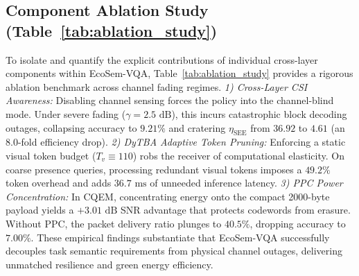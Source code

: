 \begin{table}[!t]
\centering
\caption{Component Ablation Analysis Across Channel Operating Regimes}
\label{tab:ablation_study}
\footnotesize
{}
\end{table}

\subsection{Component Ablation Study (Table~\ref{tab:ablation_study})}
To isolate and quantify the explicit contributions of individual cross-layer components within EcoSem-VQA, Table~\ref{tab:ablation_study} provides a rigorous ablation benchmark across channel fading regimes.
\textit{1) Cross-Layer CSI Awareness:} Disabling channel sensing forces the policy into the channel-blind mode. Under severe fading ($\gamma = 2.5\text{ dB}$), this incurs catastrophic block decoding outages, collapsing accuracy to $9.21\%$ and cratering $\eta_{\mathrm{SEE}}$ from $36.92$ to $4.61$ (an $8.0$-fold efficiency drop).
\textit{2) DyTBA Adaptive Token Pruning:} Enforcing a static visual token budget ($T_v \equiv 110$) robs the receiver of computational elasticity. On coarse presence queries, processing redundant visual tokens imposes a $49.2\%$ token overhead and adds $36.7\text{ ms}$ of unneeded inference latency.
\textit{3) PPC Power Concentration:} In CQEM, concentrating energy onto the compact 2000-byte payload yields a $+3.01\text{ dB}$ SNR advantage that protects codewords from erasure. Without PPC, the packet delivery ratio plunges to $40.5\%$, dropping accuracy to $7.00\%$.
These empirical findings substantiate that EcoSem-VQA successfully decouples task semantic requirements from physical channel outages, delivering unmatched resilience and green energy efficiency.

